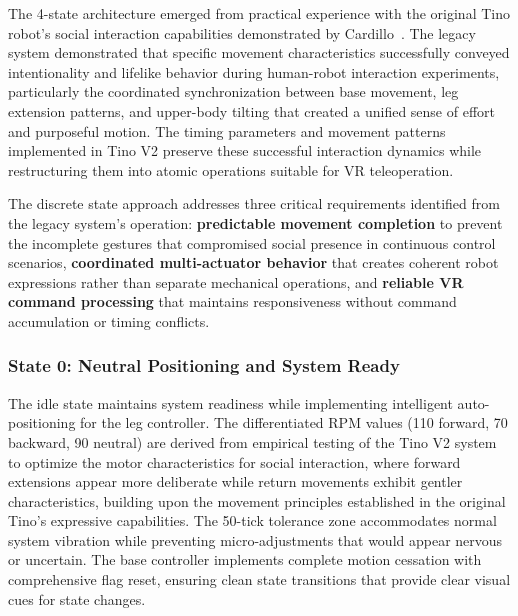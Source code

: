 The 4-state architecture emerged from practical experience with the original Tino robot's social interaction capabilities demonstrated by Cardillo~\cite{cardillo2024thesis}. The legacy system demonstrated that specific movement characteristics successfully conveyed intentionality and lifelike behavior during human-robot interaction experiments, particularly the coordinated synchronization between base movement, leg extension patterns, and upper-body tilting that created a unified sense of effort and purposeful motion. The timing parameters and movement patterns implemented in Tino V2 preserve these successful interaction dynamics while restructuring them into atomic operations suitable for VR teleoperation.

The discrete state approach addresses three critical requirements identified from the legacy system's operation: \textbf{predictable movement completion} to prevent the incomplete gestures that compromised social presence in continuous control scenarios, \textbf{coordinated multi-actuator behavior} that creates coherent robot expressions rather than separate mechanical operations, and \textbf{reliable VR command processing} that maintains responsiveness without command accumulation or timing conflicts.

\subsubsection{State 0: Neutral Positioning and System Ready}
The idle state maintains system readiness while implementing intelligent auto-positioning for the leg controller. The differentiated RPM values (110 forward, 70 backward, 90 neutral) are derived from empirical testing of the Tino V2 system to optimize the motor characteristics for social interaction, where forward extensions appear more deliberate while return movements exhibit gentler characteristics, building upon the movement principles established in the original Tino's expressive capabilities. The 50-tick tolerance zone accommodates normal system vibration while preventing micro-adjustments that would appear nervous or uncertain. The base controller implements complete motion cessation with comprehensive flag reset, ensuring clean state transitions that provide clear visual cues for state changes.

